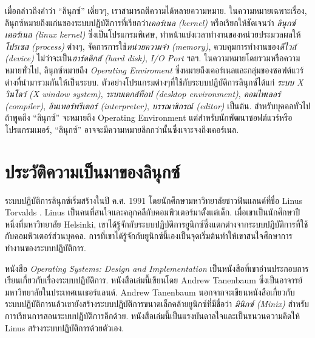 \begin{thwbr}
{%



เมื่อกล่าวถึงคำว่า ``ลินุกซ์'' เดี่ยวๆ, เราสามารถตีความได้หลายความหมาย. ในความหมายเฉพาะเรื่อง, ลินุกซ์หมายถึงแก่นของระบบปฏิบัติการที่เรียกว่า{\em เคอร์เนล (kernel)} หรือเรียกให้ชัดเจนว่า {\em ลินุกซ์เคอร์เนล (linux kernel)} ซึ่งเป็นโปรแกรมพิเศษ, 
ทำหน้าแบ่งเวลาทำงานของหน่วยประมวลผลให้{\em โปรเซส (process)} ต่างๆ, จัดการการใช้{\em หน่วยความจำ (memory)}, 
ควบคุมการทำงานของ{\em ดีไวส์ (device)} ไม่ว่าจะเป็น{\em ฮาร์ดดิกส์ (hard disk)}, {\em I/O Port} ฯลฯ.
ในความหมายโดยรวมหรือความหมายทั่วไป, ลินุกซ์หมายถึง {\em Operating Enviroment} ซึ่งหมายถึงเคอร์เนลและกลุ่มของซอฟต์แวร์ต่างที่นำมารวมกันให้เป็นระบบ.
ตัวอย่างโปรแกรมต่างๆที่ใช้กับระบบปฏิบัติการลินุกซ์ได้แก่ {\em ระบบ X วินโดว์  (X window system)}, {\em ระบบเดกส์ท็อป (desktop environment)}, {\em คอมไพเลอร์ (compiler)}, {\em อินเทอร์พรีเตอร์ (interpreter)}, {\em บรรณาธิกรณ์ (editor)} เป็นต้น. สำหรับบุคคลทั่วไปถ้าพูดถึง ``ลินุกซ์'' จะหมายถึง Operating Environment แต่สำหรับนักพัฒนาซอฟต์แวร์หรือโปรแกรมเมอร์, ``ลินุกซ์'' อาจจะมีความหมายลึกกว่านั้นซึ่งเจาะจงถึงเคอร์เนล.

\section{ประวัติความเป็นมาของลินุกซ์}

ระบบปฏิบัติการลินุกซ์เริ่มสร้างในปี ค.ศ.  1991
โดยนักศึกษามหาวิทยาลัยชาวฟินแลนด์ที่ชื่อ 
 Linus Torvalds \cite{JustForFun}.  Linus
เป็นคนที่สนใจและคลุกคลีกับคอมพิวเตอร์มาตั้งแต่เด็ก. เมื่อเขาเป็นนักศึกษาปีหนึ่งที่มหาวิทยาลัย
Helsinki, เขาได้รู้จักกับระบบปฏิบัติการยูนิกซ์ซึ่งแตกต่างจากระบบปฏิบัติการที่ใช้กับคอมพิวเตอร์ส่วนบุคคล. 
การที่เขาได้รู้จักกับยูนิกซ์นี้เองเป็นจุดเริ่มต้นทำให้เขาสนใจศึกษาการทำงานของระบบปฏิบัติการ.

หนังสือ \emph{Operating Systems: Design and
Implementation} เป็นหนังสือที่เขาอ่านประกอบการเรียนเกี่ยวกับเรื่องระบบปฏิบัติการ. หนังสือเล่มนี้เขียนโดย Andrew Tanenbaum ซึ่งเป็นอาจารย์มหาวิทยาลัยในประเทศเนเธอร์แลนด์.  Andrew Tanenbaum
นอกจากจะเขียนหนังสือเกี่ยวกับระบบปฏิบัติการแล้วเขายังสร้างระบบปฏิบัติการขนาดเล็กคล้ายยูนิกซ์ที่มีชื่อว่า {\em มินิกซ์ (Minix)} สำหรับการเรียนการสอนระบบปฏิบัติการอีกด้วย. 
หนังสือเล่มนี้เป็นแรงบันดาลใจและเป็นชนวนความคิดให้ Linus
สร้างระบบปฏิบัติการด้วยตัวเอง.  

}
\end{thwbr}
